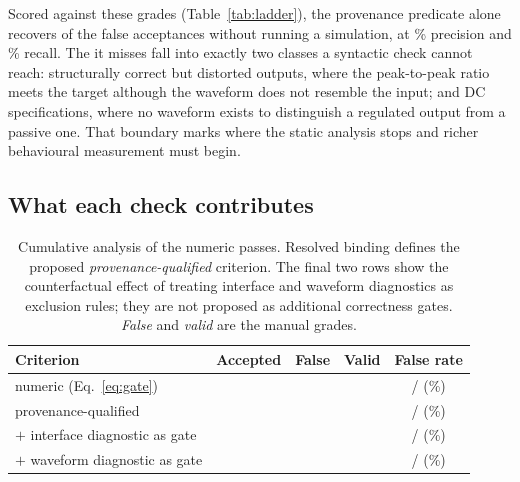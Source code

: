 Scored against these grades (Table~\ref{tab:ladder}), the provenance predicate
alone recovers \ProvTP{} of the \FalseAcceptTotal{} false acceptances without
running a simulation, at \ProvPrecision{}\% precision and \ProvRecall{}\%
recall. The \ProvFN{} it misses fall into exactly two classes a syntactic
check cannot reach: structurally correct but distorted outputs, where the
peak-to-peak ratio meets the target although the waveform does not resemble
the input; and DC specifications, where no waveform exists to distinguish a
regulated output from a passive one. That boundary marks where the static
analysis stops and richer behavioural measurement must begin.

\subsection{What each check contributes}
\label{sec:ablation}

\begin{table}[tb]
\centering
\caption{Cumulative analysis of the \NumNumericPass{} numeric passes.
  Resolved binding defines the proposed \emph{provenance-qualified}
  criterion. The final two rows show the counterfactual effect of treating
  interface and waveform diagnostics as exclusion rules; they are not
  proposed as additional correctness gates. \emph{False} and \emph{valid}
  are the manual grades.}
\label{tab:stages}
\scriptsize
\setlength{\tabcolsep}{3pt}
\begin{tabular}{@{}lcccc@{}}
\toprule
\textbf{Criterion} & \textbf{Accepted} & \textbf{False} &
  \textbf{Valid} & \textbf{False rate} \\
\midrule
numeric (Eq.~\ref{eq:gate})
  & \NumNumericPass{} & \FalseAcceptTotal{} & \LabelledReal{}
  & \FalseAcceptTotal{}/\NumNumericPass{} (\StageNumericFalseShare{}\%) \\
provenance-qualified
  & \StageProvAccepted{} & \ProvFN{} & \LabelledReal{}
  & \ProvFN{}/\StageProvAccepted{} (\StageProvFalseShare{}\%) \\
$+$ interface diagnostic as gate
  & \StageIfaceAccepted{} & \ProvFN{} & \ClearedGradedReal{}
  & \ProvFN{}/\StageIfaceAccepted{} (\StageIfaceFalseShare{}\%) \\
$+$ waveform diagnostic as gate
  & \StageWaveAccepted{} & \ProvFN{} & \ClearedGradedReal{}
  & \ProvFN{}/\StageWaveAccepted{} (\StageWaveFalseShare{}\%) \\
\bottomrule
\end{tabular}
\end{table}

